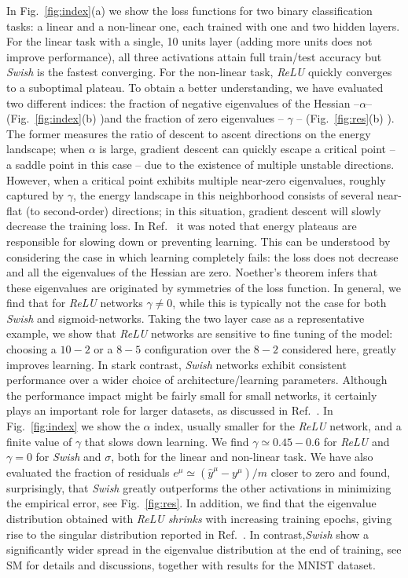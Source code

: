\documentclass[5p]{elsarticle}
\begin{document}
In Fig.~\eqref{fig:index}(a) we show the loss functions for two binary classification tasks: a linear and a non-linear one, each trained with one and two hidden layers. For the linear task with a single, 10 units layer (adding more units does not improve performance), all three activations attain full train/test accuracy but {\it Swish} is the fastest converging.  For the non-linear task, {\it ReLU} quickly converges to a suboptimal plateau. To obtain a better understanding, we have evaluated two different indices: the fraction of negative eigenvalues of the Hessian --$\alpha$--(Fig.~\ref{fig:index}(b) )and the fraction of zero eigenvalues -- $\gamma$ --  (Fig.~\ref{fig:res}(b) ). The former measures the ratio of descent to ascent directions on the energy landscape; when $\alpha$ is large, gradient descent can quickly escape a critical point -- a saddle point in this case --  due to the existence of multiple unstable directions. However, when a critical point exhibits multiple near-zero eigenvalues, roughly captured by $\gamma$, the energy landscape in this neighborhood consists of several near-flat (to second-order) directions; in this situation, gradient descent will slowly decrease the training loss. In Ref.~\cite{dauphin} it was noted that energy plateaus are responsible for slowing down or preventing learning. This can be understood by considering the case in which learning completely fails: the loss does not decrease and all the eigenvalues of the Hessian are zero. Noether's theorem infers that these eigenvalues are originated by symmetries of the loss function. %
In general, we find that  for {\it ReLU} networks $\gamma \neq 0$, while this is typically not the case for both {\it Swish} and sigmoid-networks. Taking the two layer case as a representative example, we show that {\it ReLU} networks are sensitive to fine tuning of the model: choosing a $10-2$ or a $8-5$ configuration over the $8-2$ considered here, greatly improves learning. In stark contrast, {\it Swish} networks exhibit consistent performance over a wider choice of architecture/learning parameters. Although the performance impact might be fairly small for small networks, it certainly plays an important role for larger datasets, as discussed in Ref.~\cite{prajit}.
In Fig.~\eqref{fig:index} we show the $\alpha$ index, usually smaller for the {\it ReLU} network, and a finite value of $\gamma$ that slows down learning. We find $\gamma \simeq 0.45-0.6$ for {\it ReLU} and $\gamma=0$ for {\it Swish} and $\sigma$, both for the linear and non-linear task. We have also evaluated the fraction of residuals $e^{\mu} \simeq (\hat{y}^{\mu} - y^{\mu})/m$ closer to zero and found, surprisingly, that {\it Swish} greatly outperforms the other activations in minimizing the empirical error, see Fig.~\eqref{fig:res}.
%
 In addition, we find that the eigenvalue distribution obtained with {\it ReLU}  {\it shrinks} with increasing training epochs, giving rise to the singular distribution reported in Ref.~\cite{penn1, levent}. In contrast,{\it Swish} show a significantly wider spread in the eigenvalue distribution at the end of training, see SM for details and discussions, together with results for the MNIST dataset.
 
\end{document}
